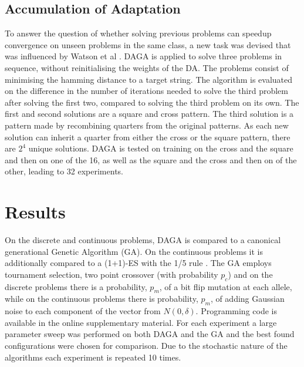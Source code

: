 \documentclass[runningheads,a4paper]{llncs}
\begin{document}
\subsection{Accumulation of Adaptation}
To answer the question of whether solving previous problems can speedup convergence on unseen problems in the same class, a new task was devised that was influenced by Watson et al \cite{watson_evolution}. DAGA is applied to solve three problems in sequence, without reinitialising the weights of the DA. The problems consist of minimising the hamming distance to a target string. The algorithm is evaluated on the difference in the number of iterations needed to solve the third problem after solving the first two, compared to solving the third problem on its own. The first and second solutions are a square and cross pattern. The third solution is a pattern made by recombining quarters from the original patterns. As each new solution can inherit a quarter from either the cross or the square pattern, there are \(2^4\) unique solutions. DAGA is tested on training on the cross and the square and then on one of the 16, as well as the square and the cross and then on of the other, leading to 32 experiments. 

\section{Results}
On the discrete and continuous problems, DAGA is compared to a canonical generational Genetic Algorithm (GA). On the continuous problems it is additionally compared to a (1+1)-ES with the 1/5 rule \cite{Igel benchmarking}. The GA employs tournament selection, two point crossover (with probability \(p_c\)) and on the discrete problems there is a probability, \(p_m\), of a bit flip mutation at each allele, while on the continuous problems there is probability, \(p_m\), of adding Gaussian noise to each component of the vector from \(N(0, \delta)\). Programming code is available in the online supplementary material.  For each experiment a large parameter sweep was performed on both DAGA and the GA and the best found configurations were chosen for comparison. Due to the stochastic nature of the algorithms each experiment is repeated 10 times.
\end{document}
